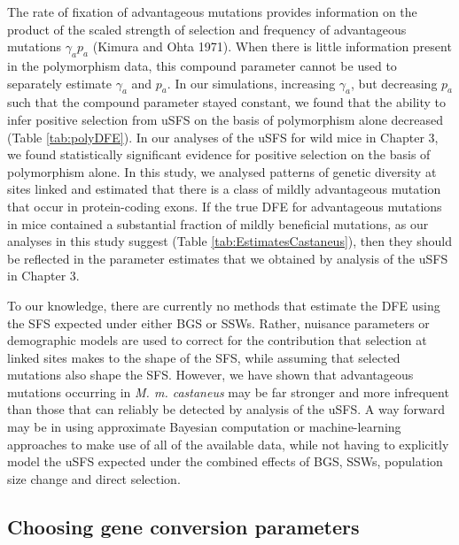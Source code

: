 {	The rate of fixation of advantageous mutations provides information on the product of the scaled strength of selection and frequency of advantageous mutations $\gamma_a p_a$ (Kimura and Ohta 1971). When there is little information present in the polymorphism data, this compound parameter cannot be used to separately estimate $\gamma_a$ and $p_a$. In our simulations, increasing $\gamma_a$, but decreasing $p_a$ such that the compound parameter stayed constant, we found that the ability to infer positive selection from uSFS on the basis of polymorphism alone decreased (Table \ref{tab:polyDFE}). In our analyses of the uSFS for wild mice in Chapter 3, we found statistically significant evidence for positive selection on the basis of polymorphism alone. In this study, we analysed patterns of genetic diversity at sites linked and estimated that there is a class of mildly advantageous mutation that occur in protein-coding exons. If the true DFE for advantageous mutations in mice contained a substantial fraction of mildly beneficial mutations, as our analyses in this study suggest (Table \ref{tab:EstimatesCastaneus}), then they should be reflected in the parameter estimates that we obtained by analysis of the uSFS in Chapter 3.

	To our knowledge, there are currently no methods that estimate the DFE using the SFS expected under either BGS or SSWs. Rather, nuisance parameters or demographic models are used to correct for the contribution that selection at linked sites makes to the shape of the SFS, while assuming that selected mutations also shape the SFS. However, we have shown that advantageous mutations occurring in \textit{M. m. castaneus} may be far stronger and more infrequent than those that can reliably be detected by analysis of the uSFS. A way forward may be in using approximate Bayesian computation or machine-learning approaches to make use of all of the available data, while not having to explicitly model the uSFS expected under the combined effects of BGS, SSWs, population size change and direct selection.
		

\subsection{Choosing gene conversion parameters}

}
